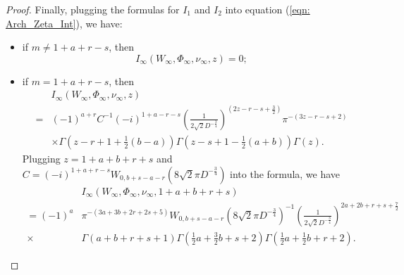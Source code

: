 \documentclass[10pt,a4paper]{amsart}
\begin{document}
\begin{proof}
        \par Finally, plugging the formulas for $I_1$ and $I_2$ into equation (\ref{eqn: Arch_Zeta_Int}), we have: 
        \begin{itemize}
            \item if $m \neq 1 + a + r - s$, then
                  \begin{equation*}
                      I_{\infty}(W_{\infty}, \Phi_{\infty}, \nu_{\infty}, z) = 0; 
                  \end{equation*}
            \item if $m = 1 + a + r - s$, then 
            \begin{align*}
                & I_{\infty}(W_{\infty}, \Phi_{\infty}, \nu_{\infty}, z) \\ = & (-1)^{a + r} C^{-1} (-i)^{1 + a - r - s} (\frac{1}{2\sqrt{2}D^{-\frac{3}{4}}})^{(2z -r - s + \frac{3}{2})}\pi^{-(3z - r - s + 2)} \\ & \times \Gamma(z - r + 1 + \frac{1}{2}(b - a)) \Gamma(z - s + 1 - \frac{1}{2} (a + b)) \Gamma(z).
            \end{align*}
            Plugging $z = 1 + a + b + r + s$ and $C = (-i)^{1 + a + r - s}W_{0, b + s - a - r}(8\sqrt{2}\pi D^{-\frac{3}{4}})$ into the formula, we have
            \begin{align*}
                &  I_{\infty}(W_{\infty}, \Phi_{\infty}, \nu_{\infty}, 1 + a + b + r + s) \\
                = (-1)^{a}& \pi^{-(3a + 3b + 2r + 2s + 5)} W_{0, b + s - a - r}(8\sqrt{2}\pi D^{-\frac{3}{4}})^{-1}\left(\frac{1}{2\sqrt{2}D^{-\frac{3}{4}}}\right)^{2a + 2b + r + s + \frac{7}{2}} \\
                \times &\Gamma(a + b + r + s + 1) \Gamma( \frac{1}{2}a + \frac{3}{2}b + s + 2) \Gamma(\frac{1}{2}a + \frac{1}{2} b + r + 2). 
            \end{align*}
        \end{itemize}
    \end{proof}
\end{document}
